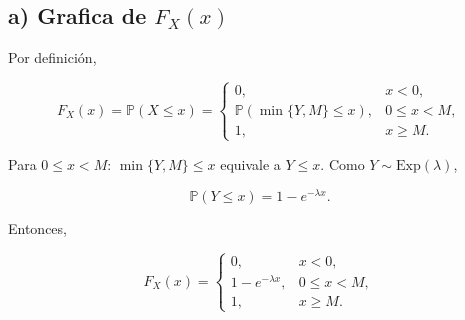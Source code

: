 \documentclass[10pt,a4paper]{article}
\let\le\leqslant
\let\ge\geqslant
\let\leq\leqslant
\let\geq\geqslant
\let\le\leq
\let\ge\geq
\begin{document}
    \begin{center}
    \end{center}
    { \hspace*{\fill} \\}
    
    \hypertarget{a-grafica-de-f_xx}{%
\subsection{\texorpdfstring{a) Grafica de
\(F_X(x)\)}{a) Grafica de F\_X(x)}}\label{a-grafica-de-f_xx}}

    Por definición,

\[
F_X(x)=\mathbb P(X\le x)=
\begin{cases}
0,&x<0,\\[2pt]
\mathbb P(\min\{Y,M\}\le x),&0\le x<M,\\[2pt]
1,&x\ge M.
\end{cases}
\]

Para \(0\le x<M\): \(\min\{Y,M\}\le x\) equivale a \(Y\le x\). Como
\(Y\sim\mathrm{Exp}(\lambda)\),

\[
\mathbb P(Y\le x)=1-e^{-\lambda x}.
\]

Entonces,

\[
F_X(x)=
\begin{cases}
0,&x<0,\\
1-e^{-\lambda x},&0\le x<M,\\
1,&x\ge M.
\end{cases}
\]
\end{document}
